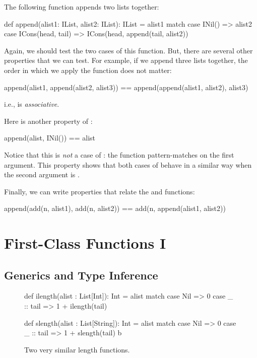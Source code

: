 \documentclass[9pt]{extbook}
\begin{document}
The following function appends two lists together:
%
\begin{scalacode}
def append(alist1: IList, alist2: IList): IList = alist1 match {
  case INil() => alist2
  case ICons(head, tail) => ICons(head, append(tail, alist2))
}
\end{scalacode}

Again, we should test the two cases of this function. But, there are
several other properties that we can test. For example, if we append
three lists together, the order in which we apply the function
does not matter:
%
\begin{scalacode}
append(alist1, append(alist2, alist3)) == append(append(alist1, alist2), alist3)
\end{scalacode}
i.e.,  is \emph{associative}.

Here is another property of :
\begin{scalacode}
append(alist, INil()) == alist
\end{scalacode}
%
Notice that this is \emph{not} a case of : the function
pattern-matches on the first argument. This property shows that both cases
of  behave in a similar way when the second argument is
.

Finally, we can write properties that relate the  and
 functions:
%
\begin{scalacode}
append(add(n, alist1), add(n, alist2)) == add(n, append(alist1, alist2))
\end{scalacode}

\chapter{First-Class Functions I}
\lstset{language=scala}

\section{Generics and Type Inference}

\begin{figure}
\begin{minipage}{0.45\textwidth}
\begin{scalacode}
def ilength(alist : List[Int]): Int = {
  alist match {
  case Nil => 0
  case _ :: tail => 1 + ilength(tail)
  }
}
\end{scalacode}
\end{minipage}
\quad\vrule\quad
\begin{minipage}{0.45\textwidth}
\begin{scalacode}
def slength(alist : List[String]): Int = {
  alist match {
    case Nil => 0
    case _ :: tail => 1 + slength(tail)
  }b
}
\end{scalacode}
\end{minipage}
\caption{Two very similar length functions.}
\label{monolength}
\end{figure}
\end{document}
